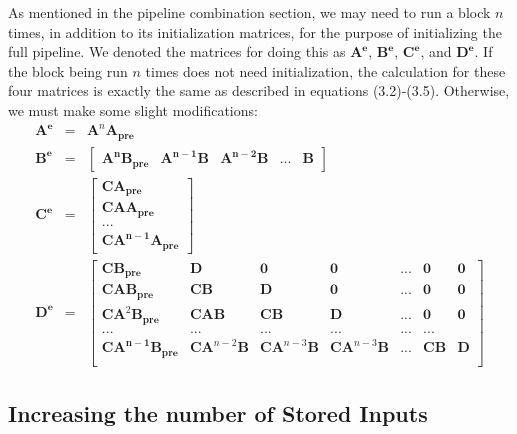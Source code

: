     As mentioned in the pipeline combination section, we may need
to run a block $n$ times, in addition to its initialization
matrices, for the purpose of initializing the full pipeline. We
denoted the matrices for doing this as $\mathbf{A^e}$,
$\mathbf{B^e}$, $\mathbf{C^e}$, and $\mathbf{D^e}$. If the block
being run $n$ times does not need initialization, the calculation
for these four matrices is exactly the same as described in
equations (3.2)-(3.5). Otherwise, we must make some slight
modifications:
\begin{eqnarray}
\mathbf{A^e} & = & \mathbf{A}^n \mathbf{A_{pre}} \\
\mathbf{B^e} & = & \left [ \begin{array} {ccccc} \mathbf{A^n}
\mathbf{B_{pre}} & \mathbf{A^{n-1}} \mathbf{B} & \mathbf{A^{n-2}}
\mathbf{B} & ... & \mathbf{B}
\end{array} \right ] \\
\mathbf{C^e} & = & \left [ \begin{array} {c} \mathbf{C} \mathbf{A_{pre}} \\
\mathbf{C} \mathbf{A} \mathbf{A_{pre}} \\ ... \\
\mathbf{C} \mathbf{A^{n-1}} \mathbf{A_{pre}} \end{array} \right ] \\
\mathbf{D^e} & = & \left [ \begin{array} {cccccccc} \mathbf{C}
\mathbf{B_{pre}} & \mathbf{D} & \mathbf{0} &
\mathbf{0} & ... & \mathbf{0} & \mathbf{0} \\
\mathbf{C} \mathbf{A} \mathbf{B_{pre}} & \mathbf{CB} &
\mathbf{D} & \mathbf{0} & ... & \mathbf{0} & \mathbf{0} \\
\mathbf{C} \mathbf{A}^2 \mathbf{B_{pre}} & \mathbf{CAB} &
\mathbf{CB} & \mathbf{D} & ... & \mathbf{0} & \mathbf{0} \\
... & ... & ... & ... & ... & ... \\
\mathbf{C} \mathbf{A^{n-1}} \mathbf{B_{pre}} & \mathbf{CA}^{n-2}
\mathbf{B} & \mathbf{CA}^{n-3} \mathbf{B} &
\mathbf{CA}^{n-3} \mathbf{B} & ... & \mathbf{CB} & \mathbf{D} \\
 \end{array} \right ]
\end{eqnarray}

\subsection{Increasing the number of Stored Inputs}

